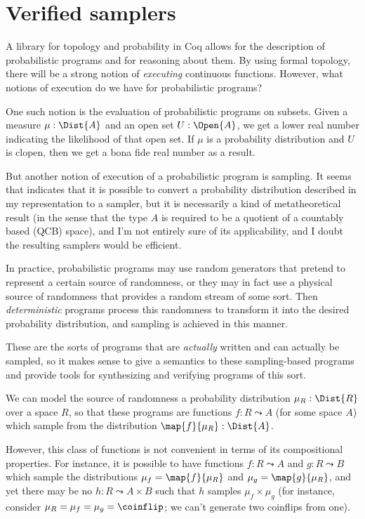\section{Verified samplers}

A library for topology and probability in Coq allows for the description of probabilistic programs and for reasoning about them. By using formal topology, there will be a strong notion of \emph{executing} continuous functions. However, what notions of execution do we have for probabilistic programs?

One such notion is the evaluation of probabilistic programs on subsets. Given a measure $\mu : \Dist{A}$ and an open set $U : \Open{A}$, we get a lower real number indicating the likelihood of that open set. If $\mu$ is a probability distribution and $U$ is clopen, then we get a bona fide real number as a result.

But another notion of execution of a probabilistic program is sampling. It seems that \cite{schroder2007} indicates that it is possible to convert a probability distribution described in my representation to a sampler, but it is necessarily a kind of metatheoretical result (in the sense that the type $A$ is required to be a quotient of a countably based (QCB) space), and I'm not entirely sure of its applicability, and I doubt the resulting samplers would be efficient.

In practice, probabilistic programs may use random generators that pretend to represent a certain source of randomness, or they may in fact use a physical source of randomness that provides a random stream of some sort. Then \emph{deterministic} programs process this randomness to transform it into the desired probability distribution, and sampling is achieved in this manner.

These are the sorts of programs that are \emph{actually} written and can actually be sampled, so it makes sense to give a semantics to these sampling-based programs and provide tools for synthesizing and verifying programs of this sort.

We can model the source of randomness a probability distribution $\mu_R : \Dist{R}$ over a space $R$, so that these programs are functions $f : R \leadsto A$ (for some space $A$) which sample from the distribution $\map{f}{\mu_R} : \Dist{A}$.

However, this class of functions is not convenient in terms of its compositional properties. For instance, it is possible to have functions $f : R \leadsto A$ and $g : R \leadsto B$ which sample the distributions $\mu_f = \map{f}{\mu_R}$ and $\mu_g = \map{g}{\mu_R}$, and yet there may be no $h : R \leadsto A \times B$ such that $h$ samples $\mu_f \times \mu_g$ (for instance, consider $\mu_R = \mu_f = \mu_g = \coinflip$; we can't generate two coinflips from one).

